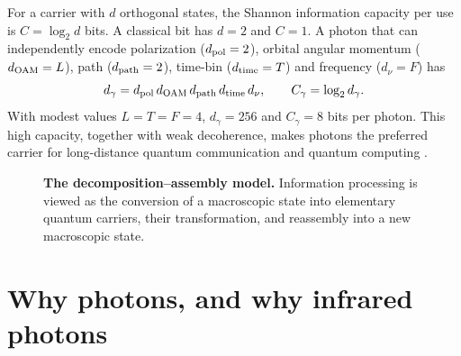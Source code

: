 \documentclass[11pt,a4paper]{article}
\begin{document}
For a carrier with $d$ orthogonal states, the Shannon information capacity per use is $C=\log_2 d$ bits. A classical bit has $d=2$ and $C=1$. A photon that can independently encode polarization ($d_{\rm pol}=2$), orbital angular momentum ($d_{\rm OAM}=L$), path ($d_{\rm path}=2$), time-bin ($d_{\rm time}=T$) and frequency ($d_{\nu}=F$) has
\begin{equation}
d_\gamma = d_{\rm pol}\, d_{\rm OAM}\, d_{\rm path}\, d_{\rm time}\, d_{\nu},
\qquad
C_\gamma = \log_2 d_\gamma.
\end{equation}
With modest values $L=T=F=4$, $d_\gamma=256$ and $C_\gamma=8$ bits per photon. This high capacity, together with weak decoherence, makes photons the preferred carrier for long-distance quantum communication and quantum computing \cite{gisin2007,erhard2020,flamini2019}.

\begin{figure}[H]
\centering
{}
\caption{\textbf{The decomposition--assembly model.} Information processing is viewed as the conversion of a macroscopic state into elementary quantum carriers, their transformation, and reassembly into a new macroscopic state.}
\label{fig:model}
\end{figure}

\section*{Why photons, and why infrared photons}
\end{document}

